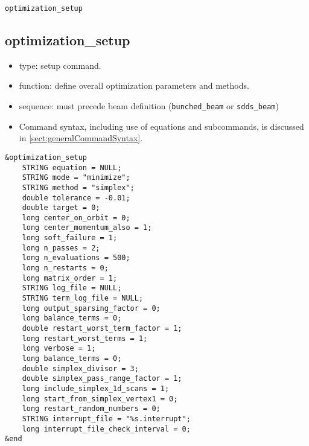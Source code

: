\documentclass[11pt]{article}
\begin{document}
\newpage
\begin{center}{\Large\verb|optimization_setup|}\end{center}
\subsection{optimization\_setup \label{subsec:optimizationsetup}}

\begin{itemize}
\item type: setup command.
\item function: define overall optimization parameters and methods.
\item sequence: must precede beam definition (\verb|bunched_beam| or \verb|sdds_beam|)
\item Command syntax, including use of equations and subcommands, is discussed in \ref{sect:generalCommandSyntax}.
\end{itemize}

\begin{verbatim}
&optimization_setup
    STRING equation = NULL;
    STRING mode = "minimize";
    STRING method = "simplex";
    double tolerance = -0.01;
    double target = 0;
    long center_on_orbit = 0;
    long center_momentum_also = 1;
    long soft_failure = 1;
    long n_passes = 2;
    long n_evaluations = 500; 
    long n_restarts = 0;
    long matrix_order = 1;
    STRING log_file = NULL;
    STRING term_log_file = NULL;
    long output_sparsing_factor = 0;
    long balance_terms = 0;
    double restart_worst_term_factor = 1;
    long restart_worst_terms = 1;
    long verbose = 1;
    long balance_terms = 0;
    double simplex_divisor = 3;
    double simplex_pass_range_factor = 1;
    long include_simplex_1d_scans = 1;
    long start_from_simplex_vertex1 = 0;
    long restart_random_numbers = 0;
    STRING interrupt_file = "%s.interrupt";
    long interrupt_file_check_interval = 0;
&end
\end{verbatim}
\end{document}
